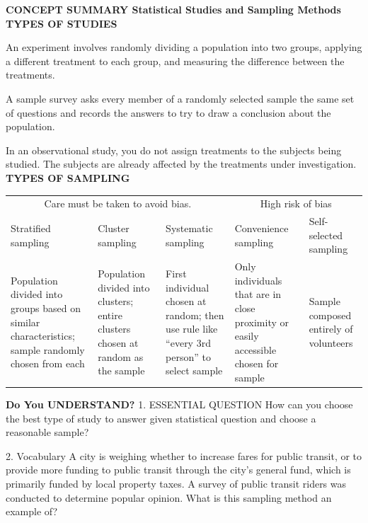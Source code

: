 \documentclass{article}
\newenvironment{concept-summary}{}{}    %
\newcommand{\answer}[1]{}               %
\newcommand{\placeholder}[2]{}          %
\begin{document}
\begin{concept-summary}
\textbf{CONCEPT SUMMARY Statistical Studies and Sampling Methods}
\textbf{TYPES OF STUDIES}
\item An experiment involves randomly dividing a population into two groups, applying a different treatment to each group, and measuring the difference between the treatments.
\item A sample survey asks every member of a randomly selected sample the same set of questions and records the answers to try to draw a conclusion about the population.
\item In an observational study, you do not assign treatments to the subjects being studied. The subjects are already affected by the treatments under investigation.
\textbf{TYPES OF SAMPLING}
\begin{tabular}{lllll}
\multicolumn{3}{c}{Care must be taken to avoid bias.} & \multicolumn{2}{c}{High risk of bias} \\
Stratified sampling & Cluster sampling & Systematic sampling & Convenience sampling & Self-selected sampling \\
Population divided into groups based on similar characteristics; sample randomly chosen from each & Population divided into clusters; entire clusters chosen at random as the sample & First individual chosen at random; then use rule like ``every 3rd person'' to select sample & Only individuals that are in close proximity or easily accessible chosen for sample & Sample composed entirely of volunteers \\
\end{tabular}
\placeholder{diagram}{Five sampling diagrams of red, blue, and purple people with selected people boxed: stratified selects two from each color group; cluster selects the whole blue group; systematic selects every third person, the right column; convenience selects six people closest to a black Researcher below the group; self-selected selects scattered volunteers with raised arms.}
\textbf{Do You UNDERSTAND?}
1. ESSENTIAL QUESTION How can you choose the best type of study to answer given statistical question and choose a reasonable sample?
\answer{Try to conduct a study where objects are selected randomly, and without bias.}
2. Vocabulary A city is weighing whether to increase fares for public transit, or to provide more funding to public transit through the city's general fund, which is primarily funded by local property taxes. A survey of public transit riders was conducted to determine popular opinion. What is this sampling method an example of?

\end{concept-summary}
\end{document}
